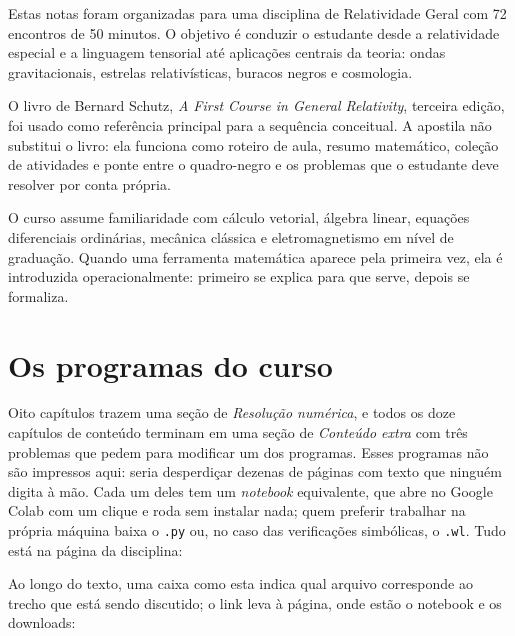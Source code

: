 \documentclass[12pt,a4paper,oneside]{book}
\theoremstyle{rgplain}
\theoremstyle{rgremark}
\begin{document}
Estas notas foram organizadas para uma disciplina de Relatividade Geral com
72 encontros de 50 minutos. O objetivo é conduzir o estudante desde a
relatividade especial e a linguagem tensorial até aplicações centrais da teoria:
ondas gravitacionais, estrelas relativísticas, buracos negros e cosmologia.

O livro de Bernard Schutz, \textit{A First Course in General Relativity}, terceira
edição, foi usado como referência principal para a sequência conceitual. A
apostila não substitui o livro: ela funciona como roteiro de aula, resumo
matemático, coleção de atividades e ponte entre o quadro-negro e os problemas
que o estudante deve resolver por conta própria.

O curso assume familiaridade com cálculo vetorial, álgebra linear, equações
diferenciais ordinárias, mecânica clássica e eletromagnetismo em nível de
graduação. Quando uma ferramenta matemática aparece pela primeira vez, ela é
introduzida operacionalmente: primeiro se explica para que serve, depois se
formaliza.

\section*{Os programas do curso}
{}

Oito capítulos trazem uma seção de \emph{Resolução numérica}, e todos os doze
capítulos de conteúdo terminam em uma seção de \emph{Conteúdo extra} com três
problemas que pedem para modificar um dos programas. Esses programas não são
impressos aqui: seria desperdiçar dezenas
de páginas com texto que ninguém digita à mão. Cada um deles tem um
\emph{notebook} equivalente, que abre no Google Colab com um clique e roda
sem instalar nada; quem preferir trabalhar na própria máquina baixa o
\texttt{.py} ou, no caso das verificações simbólicas, o \texttt{.wl}. Tudo
está na página da disciplina:

\begin{center}
  \href{\rgsitecodigos}{\texttt{\rgsitecodigos}}
\end{center}

Ao longo do texto, uma caixa como esta indica qual arquivo corresponde ao
trecho que está sendo discutido; o link leva à página, onde estão o notebook
e os downloads:

\end{document}
